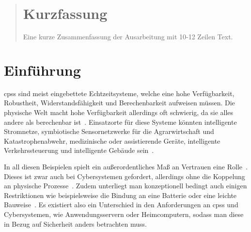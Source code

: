\documentclass[final,bibliography=totocnumbered]{include/sikseminar}
\newcommand{\cps}{\glspl{cps}\xspace}
\begin{document}
\makeTitle

\makeAuthor
\date{Datum des Vortrags \todo}
\subject{Seminar Cyber-Physical Systems}

\maketitle

\begin{abstract}
\section*{Kurzfassung}
Eine kurze Zusammenfassung der Ausarbeitung mit 10-12 Zeilen Text.
\end{abstract}
\thispagestyle{empty}
\newpage
\tableofcontents
\newpage

\section{Einführung}\label{sec:intro}
\cps sind meist eingebettete Echtzeitsysteme, welche eine hohe Verfügbarkeit, Robustheit, Widerstandsfähigkeit und Berechenbarkeit aufweisen müssen.
Die physische Welt macht hohe Verfügbarkeit allerdings oft schwierig, da sie alles andere als berechenbar ist~\cite{Lee08,SGL+08}.
Einsatzorte für diese Systeme könnten intelligente Stromnetze, symbiotische Sensornetzwerke für die Agrarwirtschaft und Katastrophenabwehr, medizinische oder assistierende Geräte, intelligente Verkehrssteuerung und intelligente Gebäude sein~\cite{RLS+10}.

In all diesen Beispielen spielt ein außerordentliches Maß an Vertrauen eine Rolle~\cite{SGL+08}.
Dieses ist zwar auch bei Cybersystemen gefordert, allerdings ohne die Koppelung an physische Prozesse~\cite{BG11}.
Zudem unterliegt man konzeptionell bedingt auch einigen Restriktionen wie beispielsweise die Bindung an eine Batterie oder eine leichte Bauweise~\cite{YWY+17}.
Es existiert also ein Unterschied in den Anforderungen an \cps und Cybersystemen, wie Anwendungsservern oder Heimcomputern, sodass man diese in Bezug auf Sicherheit anders betrachten muss.
\end{document}
